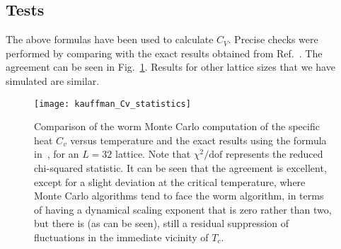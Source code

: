 \documentclass[../main.tex]{subfiles}
\begin{document}
\subsection{Tests}%
\label{ssec:tests}
The above formulas have been used to calculate $C_V$.  Precise checks were
performed by comparing with the exact results obtained from
Ref.~\cite{bkaufman}. The agreement  can be seen in Fig.~\ref{Kcompare}.
Results for other lattice sizes that we have simulated are similar.
%
\begin{figure}[htpb]
    \centering
    \texttt{[image: kauffman\_Cv\_statistics]}
    \caption{Comparison of the worm Monte Carlo computation of the specific
        heat $C_v$ versus temperature and the exact results using the formula
        in~\cite{bkaufman}, for an $L=32$ lattice. Note that $\chi^2 /
        \text{dof}$ represents the reduced chi-squared statistic. It can be
        seen that the agreement is excellent, except for a slight deviation at
        the critical temperature, where Monte Carlo algorithms tend to face
        the worm algorithm, in terms of having a dynamical scaling exponent
        that is zero rather than two, but there is (as can be seen), still a
        residual suppression of fluctuations in the immediate vicinity of
      $T_c$.}%
\label{Kcompare}
\end{figure}
%
\end{document}
